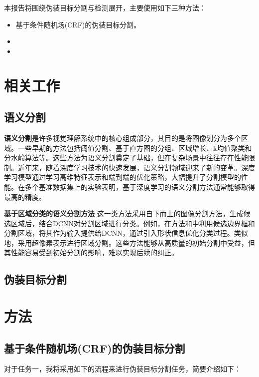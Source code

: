 \documentclass[a4paper,12pt]{ctexart}
\begin{document}
本报告将围绕伪装目标分割与检测展开，主要使用如下三种方法：
\begin{itemize}
    \item 基于条件随机场(CRF)的伪装目标分割。
    \item 
    \item 
\end{itemize}

\section{相关工作}

\subsection{语义分割}
\textbf{语义分割}是许多视觉理解系统中的核心组成部分，其目的是将图像划分为多个区域。一些早期的方法包括阈值分割\cite{Otsu1979ATS}、基于直方图的分组、区域增长\cite{Nock2004StatisticalRM}、k均值聚类\cite{Dhanachandra2015ImageSU}和分水岭算法\cite{Najman1994WatershedOA}等。这些方法为语义分割奠定了基础，但在复杂场景中往往存在性能限制。近年来，随着深度学习技术的快速发展，语义分割领域迎来了新的变革。深度学习模型通过学习高维特征表示和端到端的优化策略，大幅提升了分割模型的性能。在多个基准数据集上的实验表明，基于深度学习的语义分割方法通常能够取得最高的精度。

\textbf{基于区域分类的语义分割方法} 这一类方法采用自下而上的图像分割方法，生成候选区域后，结合DCNN对分割区域进行分类。例如，在方法\cite{Arbelez2014MultiscaleCG}和\cite{Uijlings2013SelectiveSF}中利用候选边界框和分割区域，将其作为输入提供给DCNN，通过引入形状信息优化分类过程。类似地，\cite{Mostajabi2014FeedforwardSS}采用超像素表示进行区域分割。这些方法能够从高质量的初始分割中受益，但其性能容易受到初始分割的影响，难以实现后续的纠正。

\subsection{伪装目标分割}
\section{方法}

\subsection{基于条件随机场(CRF)的伪装目标分割}

对于任务一，我将采用如下的流程来进行伪装目标分割任务，简要介绍如下：
\end{document}
